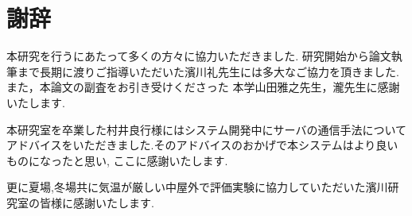 \section{謝辞}
本研究を行うにあたって多くの方々に協力いただきました.
研究開始から論文執筆まで長期に渡りご指導いただいた濱川礼先生には多大なご協力を頂きました.
また，本論文の副査をお引き受けくださった 本学山田雅之先生，瀧先生に感謝いたします.

本研究室を卒業した村井良行様にはシステム開発中にサーバの通信手法についてアドバイスをいただきました.そのアドバイスのおかげで本システムはより良いものになったと思い, ここに感謝いたします.

更に夏場,冬場共に気温が厳しい中屋外で評価実験に協力していただいた濱川研究室の皆様に感謝いたします.

